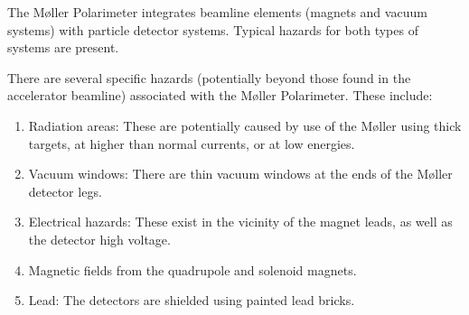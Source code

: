 \begin{safetyen}{0}{0}
%
%

The M\o ller Polarimeter integrates beamline elements (magnets and
vacuum systems) with particle detector systems. Typical hazards for
both types of systems are present.


There are several specific hazards (potentially beyond those found in
the accelerator beamline) associated with the M\o ller Polarimeter.
These include:
\begin{enumerate}
\item{Radiation areas: These are potentially caused by use of the M\o ller using thick targets, at higher than normal currents, or at low energies.}
\item{Vacuum windows: There are thin vacuum windows at the ends of the M\o ller detector legs.}
\item{Electrical hazards: These exist in the vicinity of the magnet leads, as well as the detector high voltage.}
\item{Magnetic fields from the quadrupole and solenoid magnets.}
\item{Lead: The detectors are shielded using painted lead bricks.}
\end{enumerate}



\end{safetyen}
